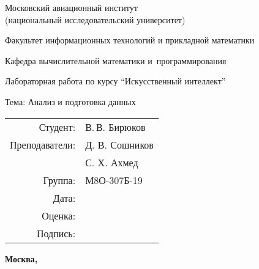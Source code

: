 \begin{titlepage}
\begin{center}
\bfseries

{\Large Московский авиационный институт\\ (национальный исследовательский университет)

}

\vspace{48pt}

{\large Факультет информационных технологий и прикладной математики
}

\vspace{36pt}

{\large Кафедра вычислительной математики и~программирования

}


\vspace{48pt}

Лабораторная работа  по курсу \enquote{Искусственный интеллект}

Тема: Анализ и подготовка данных

\end{center}

\vspace{72pt}

\begin{flushright}
\begin{tabular}{rl}
Студент: & В.\,В. Бирюков \\
Преподаватели: & Д. В. Сошников\\
& С. Х. Ахмед\\
Группа: & М8О-307Б-19 \\
Дата: & \\
Оценка: & \\
Подпись: & \\
\end{tabular}
\end{flushright}

\vfill

\begin{center}
\bfseries
Москва, \the\year
\end{center}
\end{titlepage}

\pagebreak
